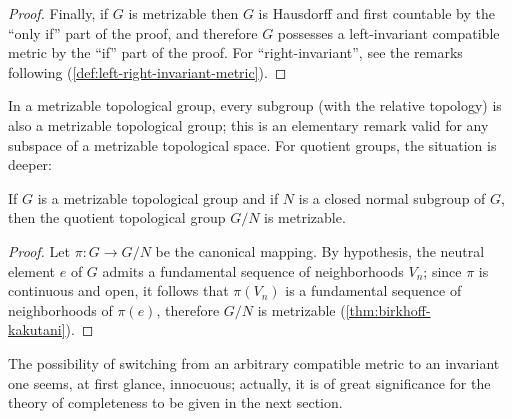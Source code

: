\begin{proof}
    Finally, if $G$ is metrizable then $G$ is Hausdorff and first countable by the “only if” part of the proof, and therefore $G$ possesses a left-invariant compatible metric by the “if” part of the proof. For “right-invariant”, see the remarks following (\ref{def:left-right-invariant-metric}).
\end{proof}


In a metrizable topological group, every subgroup (with the relative topology) is also a metrizable topological group; this is an elementary remark valid for any subspace of a metrizable topological space. For quotient groups, the situation is deeper:


\begin{corollary}
    If $G$ is a metrizable topological group and if $N$ is a closed normal subgroup of $G$, then the quotient topological group $G/N$ is metrizable.
\end{corollary}

\begin{proof}
    Let $\pi : G \to G/N$ be the canonical mapping. By hypothesis, the neutral element $e$ of $G$ admits a fundamental sequence of neighborhoods $V_n$; since $\pi$ is continuous and open, it follows that $\pi(V_n)$ is a fundamental sequence of neighborhoods of $\pi(e)$, therefore $G/N$ is metrizable (\ref{thm:birkhoff-kakutani}).
\end{proof}


The possibility of switching from an arbitrary compatible metric to an invariant one seems, at first glance, innocuous; actually, it is of great significance for the theory of completeness to be given in the next section.




